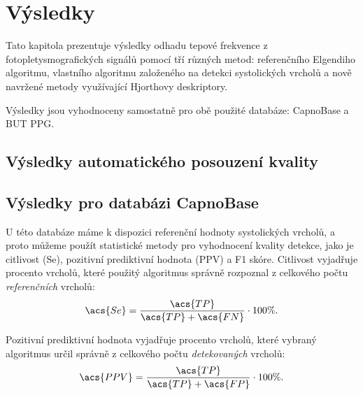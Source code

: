 \chapter{Výsledky}
\label{ch:vysledky}
Tato kapitola prezentuje výsledky odhadu tepové frekvence z fotopletysmografických signálů pomocí tří různých metod:
referenčního Elgendiho algoritmu, vlastního algoritmu založeného na detekci systolických vrcholů a nově navržené metody využívající Hjorthovy deskriptory.

Výsledky jsou vyhodnoceny samostatně pro obě použité databáze: CapnoBase a \acl{BUT PPG}.

\section{Výsledky automatického posouzení kvality}
\label{sec:vysledky_kvalita}

\section{Výsledky pro databázi CapnoBase}
\label{sec:vysledky_capnobase}
U této databáze máme k dispozici referenční hodnoty systolických vrcholů, a proto můžeme použít statistické metody pro vyhodnocení kvality detekce, jako je citlivost (\acs{Se}), pozitivní prediktivní hodnota (\acs{PPV}) a F1 skóre.
Citlivost vyjadřuje procento vrcholů, které použitý algoritmus správně rozpoznal z celkového počtu \textit{referenčních} vrcholů:
\begin{equation}
	\label{eq:se}
	\acs{Se} = \frac{\acs{TP}}{\acs{TP} + \acs{FN}} \cdot 100\%.
\end{equation}

Pozitivní prediktivní hodnota vyjadřuje procento vrcholů, které vybraný algoritmus určil správně z celkového počtu \textit{detekovaných} vrcholů:
\begin{equation}
	\label{eq:ppv}
	\acs{PPV} = \frac{\acs{TP}}{\acs{TP} + \acs{FP}} \cdot 100\%.
\end{equation}


